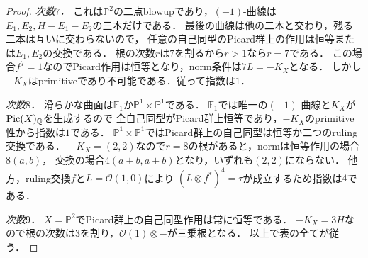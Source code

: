 \documentclass[11pt,a4paper]{ltjsarticle}
\begin{document}
\begin{proof}
\emph{次数$7$．}
これは$\mathbb P^2$の二点blowupであり，$(-1)$-曲線は
$E_1,E_2,H-E_1-E_2$の三本だけである．
最後の曲線は他の二本と交わり，残る二本は互いに交わらないので，
任意の自己同型のPicard群上の作用は恒等または$E_1,E_2$の交換である．
根の次数$r$は$7$を割るから$r>1$なら$r=7$である．
この場合$f^7=1$なのでPicard作用は恒等となり，norm条件は$7L=-K_X$となる．
しかし$-K_X$はprimitiveであり不可能である．従って指数は$1$．

\emph{次数$8$．}
滑らかな曲面は$\mathbb F_1$か$\mathbb P^1\times\mathbb P^1$である．
$\mathbb F_1$では唯一の$(-1)$-曲線と$K_X$が$\operatorname{Pic}(X)_{\mathbb Q}$を生成するので
全自己同型がPicard群上恒等であり，$-K_X$のprimitive性から指数は$1$である．
$\mathbb P^1\times\mathbb P^1$ではPicard群上の自己同型は恒等か二つのruling交換である．
$-K_X=(2,2)$なので$r=8$の根があると，normは恒等作用の場合$8(a,b)$，
交換の場合$4(a+b,a+b)$となり，いずれも$(2,2)$にならない．
他方，ruling交換$f$と$L=\mathcal O(1,0)$により
$(L\otimes f^*)^4=\tau$が成立するため指数は$4$である．

\emph{次数$9$．}
$X=\mathbb P^2$でPicard群上の自己同型作用は常に恒等である．
$-K_X=3H$なので根の次数は$3$を割り，$\mathcal O(1)\otimes-$が三乗根となる．
以上で表の全てが従う．
\end{proof}
\end{document}
